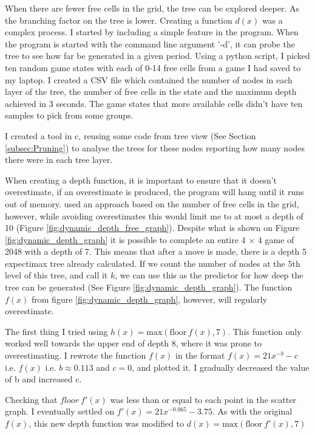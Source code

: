 \documentclass{article}
\begin{document}
When there are fewer free cells in the grid, the tree can be explored deeper. As the branching factor on the tree is lower. Creating a function $d(x)$ was a complex process. I started by including a simple feature in the program. When the program is started with the command line argument '-d', it can probe the tree to see how far be generated in a given period. Using a python script, I picked ten random game states with each of 0-14 free cells from a game I had saved to my laptop. I created a CSV file which contained the number of nodes in each layer of the tree, the number of free cells in the state and the maximum depth achieved in 3 seconds. The game states that more available cells didn't have ten samples to pick from some groups.

I created a tool in c, reusing some code from tree view (See Section \ref{subsec:Pruning}) to analyse the trees for these nodes reporting how many nodes there were in each tree layer.

When creating a depth function, it is important to ensure that it doesn't overestimate, if an overestimate is produced, the program will hang until it runs out of memory. \cite{expectimax2048} used an approach based on the number of free cells in the grid, however, while avoiding overestimates this would limit me to at most a depth of 10 (Figure \ref{fig:dynamic_depth_free_graph}). Despite what is shown on Figure \ref{fig:dynamic_depth_graph} it is possible to complete an entire 4 × 4 game of 2048 with a depth of 7. This means that after a move is made, there is a depth 5 expectimax tree already calculated. If we count the number of nodes at the 5th level of this tree, and call it $k$, we can use this as the predictor for how deep the tree can be generated (See Figure \ref{fig:dynamic_depth_graph}). The function $f(x)$ from figure \ref{fig:dynamic_depth_graph}, however, will regularly overestimate.

The first thing I tried using $h(x) = \text{max} (\text{floor}~f(x), 7)$. This function only worked well towards the upper end of depth 8, where it was prone to overestimating. I rewrote the function $f(x)$ in the format $f(x) = 21x^{-b} -c$ i.e. $f(x)$ i.e. $b\approx 0.113$ and $c = 0$, and plotted it. I gradually decreased the value of b and increased c.

Checking that $floor~f'(x)$ was less than or equal to each point in the scatter graph. I eventually settled on $f'(x)=21x^{-0.065} - 3.75$. As with the original $f(x)$, this new depth function was modified to $d(x) = \text{max}(\text{floor}~f'(x), 7)$
 
\end{document}
